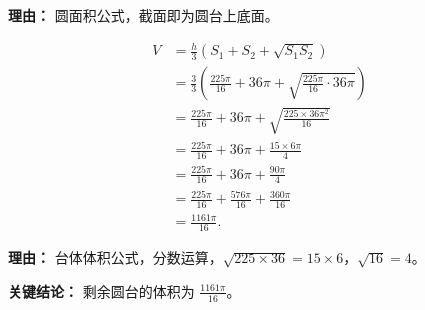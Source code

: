 \begin{examplebox}
\begin{description}[style=nextline, leftmargin=2.8em, labelsep=0.5em, itemsep=0.45em]
		      \par\textbf{理由：} 圆面积公式，截面即为圆台上底面。

		\item[\textbf{第三步（代入台体体积公式）：}]
		      \[
			      \begin{aligned}
				      V
				       & =\frac{h}{3}(S_1+S_2+\sqrt{S_1S_2})                                                 \\
				       & =\frac{3}{3}\left(\frac{225\pi}{16}+36\pi+\sqrt{\frac{225\pi}{16}\cdot36\pi}\right) \\
				       & =\frac{225\pi}{16}+36\pi+\sqrt{\frac{225\times36\pi^2}{16}}                         \\
				       & =\frac{225\pi}{16}+36\pi+\frac{15\times6\pi}{4}                                     \\
				       & =\frac{225\pi}{16}+36\pi+\frac{90\pi}{4}                                            \\
				       & =\frac{225\pi}{16}+\frac{576\pi}{16}+\frac{360\pi}{16}                              \\
				       & =\frac{1161\pi}{16}.
			      \end{aligned}
		      \]

		      \par\textbf{理由：} 台体体积公式，分数运算，$\sqrt{225\times36}=15\times6$，$\sqrt{16}=4$。
	\end{description}

	\textbf{\textcolor{CExample}{关键结论：}} 剩余圆台的体积为 $\displaystyle\frac{1161\pi}{16}$。

\end{examplebox}